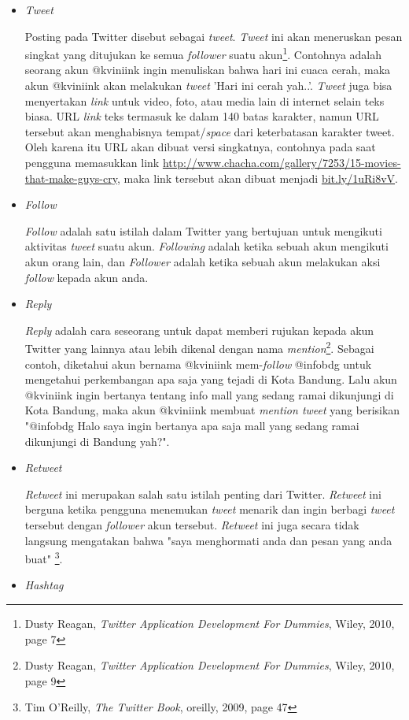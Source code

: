 \begin{itemize}
	\item \textit{Tweet} 
	
	Posting pada Twitter disebut sebagai \textit{tweet}. \textit{Tweet} ini akan meneruskan pesan singkat yang ditujukan ke semua \textit{follower} suatu akun\footnote{Dusty Reagan, \textit{Twitter Application Development For Dummies}, Wiley, 2010, page 7}. Contohnya adalah seorang akun @kviniink ingin menuliskan bahwa hari ini cuaca cerah, maka akun @kviniink akan melakukan \textit{tweet} 'Hari ini cerah yah..'. \textit{Tweet} juga bisa menyertakan \textit{link} untuk video, foto, atau media lain di internet selain teks biasa. URL \textit{link} teks termasuk ke dalam 140 batas karakter, namun URL tersebut akan menghabisnya tempat/\textit{space} dari keterbatasan karakter tweet. Oleh karena itu URL akan dibuat versi singkatnya, contohnya pada saat pengguna memasukkan link \url{http://www.chacha.com/gallery/7253/15-movies-that-make-guys-cry}, maka link tersebut akan dibuat menjadi \url{bit.ly/1uRi8vV}. 
	\item \textit{Follow}
	
	\textit{Follow} adalah satu istilah dalam Twitter yang bertujuan untuk mengikuti aktivitas \textit{tweet} suatu akun. \textit{Following} adalah ketika sebuah akun mengikuti akun orang lain, dan \textit{Follower} adalah ketika sebuah akun melakukan aksi \textit{follow} kepada akun anda.
	\item \textit{Reply} 
	
	\textit{Reply} adalah cara seseorang untuk dapat memberi rujukan kepada akun Twitter yang lainnya atau lebih dikenal dengan nama \textit{mention}\footnote{Dusty Reagan, \textit{Twitter Application Development For Dummies}, Wiley, 2010, page 9}. Sebagai contoh, diketahui akun bernama @kviniink mem-\textit{follow} @infobdg untuk mengetahui perkembangan apa saja yang tejadi di Kota Bandung. Lalu akun @kviniink ingin bertanya tentang info mall yang sedang ramai dikunjungi di Kota Bandung, maka akun @kviniink membuat \textit{mention tweet} yang berisikan "@infobdg Halo saya ingin bertanya apa saja mall yang sedang ramai dikunjungi di Bandung yah?".
	\item \textit{Retweet}
	
	\textit{Retweet} ini merupakan salah satu istilah penting dari Twitter. \textit{Retweet} ini berguna ketika pengguna menemukan \textit{tweet} menarik dan ingin  berbagi \textit{tweet} tersebut dengan \textit{follower} akun tersebut. \textit{Retweet} ini juga secara tidak langsung mengatakan bahwa "saya menghormati anda dan pesan yang anda buat" \footnote{Tim O’Reilly, \textit{The Twitter Book}, oreilly, 2009, page 47}.
	\item \textit{Hashtag}
	

\end{itemize}
